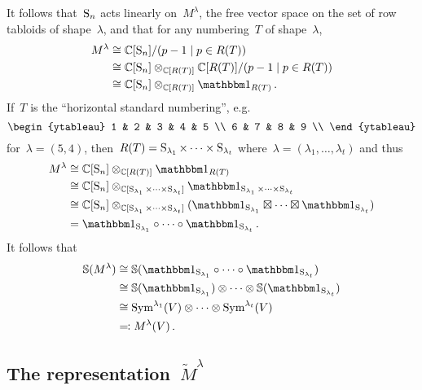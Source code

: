 \documentclass[a4paper,10pt]{scrartcl}
\begin{document}
It follows that~$\operatorname{S}_n$ acts linearly on~$M^\lambda$, the free vector space on the set of row tabloids of shape~$\lambda$, and that for any numbering~$T$ of shape~$\lambda$,
\begin{align*}
  M^\lambda
  &\cong
  \Complex[\symm_n]/(p - 1 \suchthat p \in R(T))
  \\
  &\cong
  \Complex[\symm_n] \tensor_{\Complex[R(T)]} \Complex[R(T)]/(p - 1 \suchthat p \in R(T))
  \\
  &\cong
  \Complex[\symm_n] \tensor_{\Complex[R(T)]} \trivrep_{R(T)} \,.
\end{align*}
If~$T$ is the \enquote{horizontal standard numbering}, e.g.
\[
  \begin{ytableau}
     1 &  2 & 3 & 4 & 5 \\
     6 &  7 & 8 & 9 \\
  \end{ytableau}
\]
for~$\lambda = (5,4)$, then~$R(T) = \operatorname{S}_{\lambda_1} \times \dotsb \times \operatorname{S}_{\lambda_t}$ where~$\lambda = (\lambda_1, \dotsc, \lambda_t)$ and thus
\begin{align*}
  M^\lambda
  &\cong
  \Complex[\symm_n] \tensor_{\Complex[R(T)]} \trivrep_{R(T)}
  \\
  &\cong
  \Complex[\symm_n]
  \tensor_{\Complex[\symm_{\lambda_1} \times \dotsb \times \symm_{\lambda_t}]}
  \trivrep_{\symm_{\lambda_1} \times \dotsb \times \symm_{\lambda_t}}
  \\
  &\cong
  \Complex[\symm_n]
  \tensor_{\Complex[\symm_{\lambda_1} \times \dotsb \times \symm_{\lambda_t}]}
  (\trivrep_{\symm_{\lambda_1}} \outertensor \dotsb \outertensor \trivrep_{\symm_{\lambda_t}})
  \\
  &=
  \trivrep_{\symm_{\lambda_1}} \circ \dotsb \circ \trivrep_{\symm_{\lambda_t}} \,.
\end{align*}
It follows that
\begin{align*}
  \Schur(M^\lambda)
  &\cong
  \Schur(\trivrep_{\symm_{\lambda_1}} \circ \dotsb \circ \trivrep_{\symm_{\lambda_t}})
  \\
  &\cong
  \Schur(\trivrep_{\symm_{\lambda_1}}) \tensor \dotsb \tensor \Schur(\trivrep_{\symm_{\lambda_t}})
  \\
  &\cong
  \Symm^{\lambda_1}(V) \tensor \dotsb \tensor \Symm^{\lambda_t}(V)
  \\
  &\defines
  M^\lambda(V) \,.
\end{align*}



\subsection{The representation~$\widetilde{M}^\lambda$}
\end{document}
